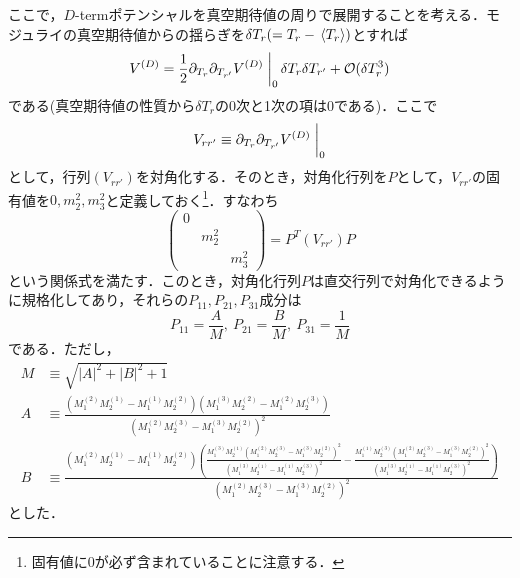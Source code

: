 \documentclass[a4paper,uplatex,dvipdfmx,10pt]{jsarticle}
\theoremstyle{definition}
\begin{document}
ここで，$D$-termポテンシャルを真空期待値の周りで展開することを考える．モジュライの真空期待値からの揺らぎを$\delta T_{r}(=T_{r}-\ev*{T_{r}})$とすれば
\begin{equation}
   V^{(D)}
   =
   \frac{1}{2}
   \partial_{T_{r}}\partial_{T_{r'}}V^{(D)}
   \left.\vphantom{\frac{1}{2}}\right|_{0}
   \delta T_{r}\delta T_{r'}
   +
   \mathcal{O}(\delta T_{r}^{3})
   \label{D-term_potential_3}
\end{equation}
である(真空期待値の性質から$\delta T_{r}$の0次と1次の項は0である)．ここで
\begin{equation}
   V_{rr'}
   \equiv
   \partial_{T_{r}}\partial_{T_{r'}}V^{(D)}
   \left.\vphantom{\frac{1}{2}}\right|_{0}
   \nonumber
\end{equation}
として，行列$(V_{rr'})$を対角化する．そのとき，対角化行列を$P$として，$V_{rr'}$の固有値を$0,m_{2}^{2},m_{3}^{2}$と定義しておく\footnote{
   固有値に0が必ず含まれていることに注意する．
}．すなわち
\begin{equation}
   \begin{pmatrix}
      0 &  & \\
      & m_{2}^2 & \\
      & & m_{3}^{2}
   \end{pmatrix}
   =
   P^{T}
   (V_{rr'})
   P
   \label{eigencal_V}
\end{equation}
という関係式を満たす．このとき，対角化行列$P$は直交行列で対角化できるように規格化してあり，それらの$P_{11},P_{21},P_{31}$成分は
\begin{equation}
   P_{11}
   =
   \frac{A}{M}
   ,\ 
   P_{21}
   =
   \frac{B}{M}
   ,\ 
   P_{31}
   =
   \frac{1}{M}
   \label{P_components}
\end{equation}
である．ただし，
\begin{align}
   M
   &\equiv
   \sqrt{\left| A\right| ^2+\left| B\right| ^2+1}
   \nonumber
   \\
   A
   &\equiv
   \frac{(M_{1}^{(2)} M_{2}^{(1)}-M_{1}^{(1)} M_{2}^{(2)}) \left(M_{1}^{(3)} M_{2}^{(2)} -M_{1}^{(2)} M_{2}^{(3)} \right)}{(M_{1}^{(2)} M_{2}^{(3)}-M_{1}^{(3)} M_{2}^{(2)})^2 }
   \nonumber
   \\
   B
   &\equiv
   \frac{(M_{1}^{(2)} M_{2}^{(1)}-M_{1}^{(1)} M_{2}^{(2)}) \left(\frac{M_{1}^{(3)} M_{2}^{(1)} (M_{1}^{(2)} M_{2}^{(3)} -M_{1}^{(3)} M_{2}^{(2)} )^2}{(M_{1}^{(3)} M_{2}^{(1)}-M_{1}^{(1)} M_{2}^{(3)})^2}-\frac{M_{1}^{(1)} M_{2}^{(3)} (M_{1}^{(2)} M_{2}^{(3)} -M_{1}^{(3)} M_{2}^{(2)} )^2}{(M_{1}^{(3)} M_{2}^{(1)}-M_{1}^{(1)} M_{2}^{(3)})^2}\right)}{(M_{1}^{(2)} M_{2}^{(3)}-M_{1}^{(3)} M_{2}^{(2)})^2}
   \nonumber
\end{align}
とした．
\end{document}

